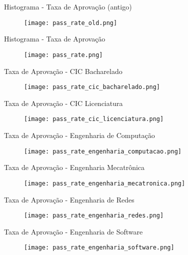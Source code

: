 \begin{frame}{Histograma - Taxa de Aprovação (antigo)}
    \begin{figure}[!ht]
    \centering
    \texttt{[image: pass\_rate\_old.png]}
    \end{figure}
\end{frame}

\begin{frame}{Histograma - Taxa de Aprovação}
    \begin{figure}[!ht]
    \centering
    \texttt{[image: pass\_rate.png]}
    \end{figure}
\end{frame}

\begin{frame}{Taxa de Aprovação - CIC Bacharelado}
    \begin{figure}[!ht]
    \centering
    \texttt{[image: pass\_rate\_cic\_bacharelado.png]}
    \end{figure}
\end{frame}

\begin{frame}{Taxa de Aprovação - CIC Licenciatura}
    \begin{figure}[!ht]
    \centering
    \texttt{[image: pass\_rate\_cic\_licenciatura.png]}
    \end{figure}
\end{frame}

\begin{frame}{Taxa de Aprovação - Engenharia de Computação}
    \begin{figure}[!ht]
    \centering
    \texttt{[image: pass\_rate\_engenharia\_computacao.png]}
    \end{figure}
\end{frame}

\begin{frame}{Taxa de Aprovação - Engenharia Mecatrônica}
    \begin{figure}[!ht]
    \centering
    \texttt{[image: pass\_rate\_engenharia\_mecatronica.png]}
    \end{figure}
\end{frame}

\begin{frame}{Taxa de Aprovação - Engenharia de Redes}
    \begin{figure}[!ht]
    \centering
    \texttt{[image: pass\_rate\_engenharia\_redes.png]}
    \end{figure}
\end{frame}

\begin{frame}{Taxa de Aprovação - Engenharia de Software}
    \begin{figure}[!ht]
    \centering
    \texttt{[image: pass\_rate\_engenharia\_software.png]}
    \end{figure}
\end{frame}

